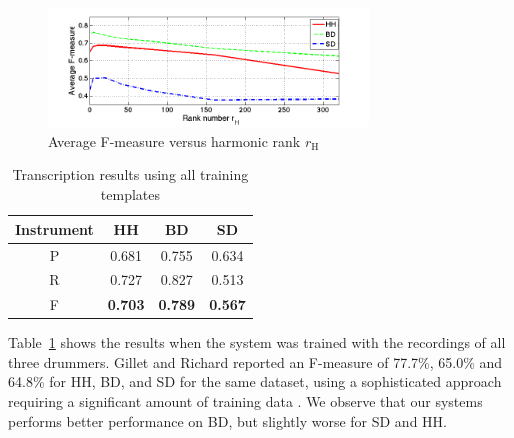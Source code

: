 \documentclass{article}
\newcommand{\tabref}[1]{\mbox{Table~\ref{#1}}}
\begin{document}
\begin{figure}
 \centerline{
 \includegraphics[width=8.5cm]{rankTest.png}}
 \caption{Average F-measure versus harmonic rank $r_\mathrm{H}$}%
 \label{fig:rankTest}
\end{figure}

\begin{table}[ht]
\begin{footnotesize}
\begin{center}
\begin{tabular}{|c|c|c|c|}
\hline
Instrument & HH             & BD             & SD             \\ \hline
P          & 0.681          & 0.755          & 0.634          \\ \hline
R          & 0.727          & 0.827          & 0.513          \\ \hline
F          & \textbf{0.703} & \textbf{0.789} & \textbf{0.567} \\ \hline
\end{tabular}
\end{center}
\caption{Transcription results using all training templates}
\label{tab:basicResults}
\end{footnotesize}
\end{table}
  
\tabref{tab:basicResults} shows the results when the system was trained with the recordings of all three drummers.
Gillet and Richard reported an F-measure of 77.7\%, 65.0\% and 64.8\% for HH, BD, and SD for the same dataset, using a sophisticated approach requiring a significant amount of training data \cite{gillet_transcription_2008}. We observe that our systems performs better performance on BD, but slightly worse for SD and HH. 
\end{document}
